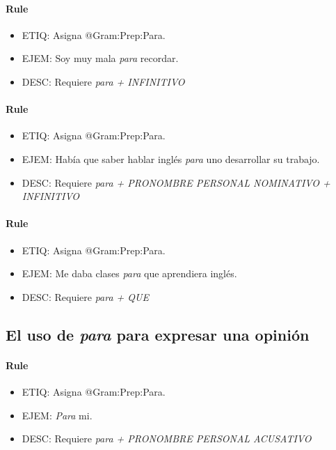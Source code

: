 \documentclass[11pt]{report}
\begin{document}
\paragraph*{Rule}
\begin{itemize}
\item ETIQ: Asigna @Gram:Prep:Para.
\item EJEM: Soy muy mala \emph{para} recordar.
\item DESC: Requiere \emph{para + INFINITIVO}
\end{itemize}

\paragraph*{Rule}
\begin{itemize}
\item ETIQ: Asigna @Gram:Prep:Para.
\item EJEM: Había que saber hablar inglés \emph{para} uno desarrollar su trabajo.
\item DESC: Requiere \emph{para + PRONOMBRE PERSONAL NOMINATIVO + INFINITIVO}
\end{itemize}

\paragraph*{Rule}
\begin{itemize}
\item ETIQ: Asigna @Gram:Prep:Para.
\item EJEM: Me daba clases \emph{para} que aprendiera inglés.
\item DESC: Requiere \emph{para + QUE}
\end{itemize}

\subsection{El uso de \emph{para} para expresar una opinión}
\paragraph*{Rule}
\begin{itemize}
\item ETIQ: Asigna @Gram:Prep:Para.
\item EJEM: \emph{Para} mi.
\item DESC: Requiere \emph{para + PRONOMBRE PERSONAL ACUSATIVO}
\end{itemize}
\end{document}
